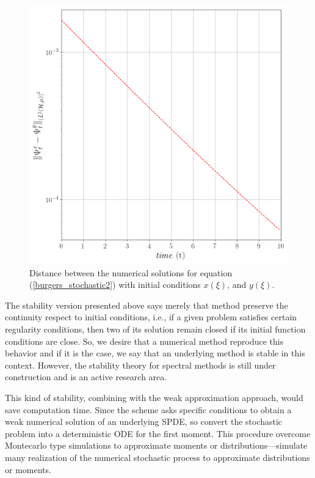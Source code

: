 	\begin{figure}[H]
	\centering
		\includegraphics[width=.7\textwidth]{Figures/norms.png}
		\caption{Distance between the numerical solutions for equation (\ref{burgers_stochastic2}) with initial conditions $x(\xi)$, and $y(\xi)$.}
	\end{figure}
	
	The stability version presented above says merely that method preserve the continuity respect to initial conditions, i.e., if a given problem satisfies certain regularity conditions, then two of its solution remain closed if its initial function conditions are close. So, we desire that a numerical method reproduce this behavior and if it is the case, we say that an underlying method is stable in this context. However, the stability theory for spectral methods is still under construction and is an active research area. 
	
	
	This kind of stability, combining with the weak approximation approach, would save computation time. Since the scheme asks specific conditions to obtain a weak numerical solution of an underlying SPDE, so convert the stochastic problem into a deterministic ODE for the first moment. This procedure overcome Montecarlo type simulations to approximate moments or distributions—simulate many realization of the numerical stochastic process to approximate distributions or moments.	 